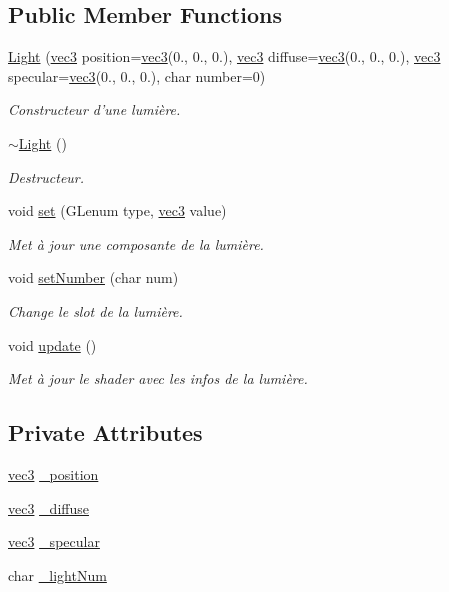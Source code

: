 \subsection*{Public Member Functions}
\begin{DoxyCompactItemize}
\item 
\hyperlink{class_light_a661826269046b9f5d0e7eb8415e6fd12}{Light} (\hyperlink{structvec3}{vec3} position=\hyperlink{structvec3}{vec3}(0., 0., 0.), \hyperlink{structvec3}{vec3} diffuse=\hyperlink{structvec3}{vec3}(0., 0., 0.), \hyperlink{structvec3}{vec3} specular=\hyperlink{structvec3}{vec3}(0., 0., 0.), char number=0)
\begin{DoxyCompactList}\small\item\em Constructeur d'une lumière. \end{DoxyCompactList}\item 
\hyperlink{class_light_ad0e59fad13bb6cfadc25b2c477e9ddc7}{$\sim$\+Light} ()
\begin{DoxyCompactList}\small\item\em Destructeur. \end{DoxyCompactList}\item 
void \hyperlink{class_light_a9fcc4b3ffdeedbe214ee8384c7d311b9}{set} (G\+Lenum type, \hyperlink{structvec3}{vec3} value)
\begin{DoxyCompactList}\small\item\em Met à jour une composante de la lumière. \end{DoxyCompactList}\item 
void \hyperlink{class_light_a985e67a0b88ba49ec8da5d5b205d06ed}{set\+Number} (char num)
\begin{DoxyCompactList}\small\item\em Change le slot de la lumière. \end{DoxyCompactList}\item 
void \hyperlink{class_light_a295eaf1ef5ebd30fa4997d4f7ccbb7e1}{update} ()
\begin{DoxyCompactList}\small\item\em Met à jour le shader avec les infos de la lumière. \end{DoxyCompactList}\end{DoxyCompactItemize}
\subsection*{Private Attributes}
\begin{DoxyCompactItemize}
\item 
\hyperlink{structvec3}{vec3} \hyperlink{class_light_a3af8c823a869606782bd9e1872586b72}{\+\_\+position}
\item 
\hyperlink{structvec3}{vec3} \hyperlink{class_light_a32445f2054766ef532c29eb514b2599d}{\+\_\+diffuse}
\item 
\hyperlink{structvec3}{vec3} \hyperlink{class_light_a36414dc1e8a75b36652bc5a12b2ea43d}{\+\_\+specular}
\item 
char \hyperlink{class_light_a072b63fbb9a1269db4241e09db7588b1}{\+\_\+light\+Num}
\end{DoxyCompactItemize}
